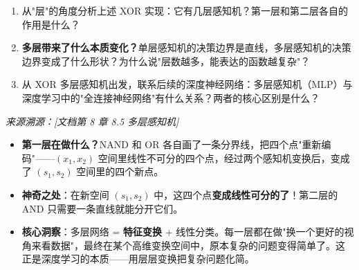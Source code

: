 \documentclass[a4paper,11pt]{ctexart}
\begin{document}
\begin{problembox}
\begin{enumerate}[(1)]
        \item 从"层"的角度分析上述 XOR 实现：它有几层感知机？第一层和第二层各自的作用是什么？

        \item \textbf{多层带来了什么本质变化？}单层感知机的决策边界是直线，多层感知机的决策边界变成了什么形状？为什么说"层数越多，能表达的函数越复杂"？

        \item 从 XOR 多层感知机出发，联系后续的深度神经网络：多层感知机（MLP）与深度学习中的"全连接神经网络"有什么关系？两者的核心区别是什么？
    \end{enumerate}

    \vspace{0.2cm}
    {\color{gray}\small\textit{来源溯源：[文档第 8 章 8.5 多层感知机]}}
\end{problembox}

\begin{beginnerbox}
    \begin{itemize}
        \item \textbf{第一层在做什么？}NAND 和 OR 各自画了一条分界线，把四个点"重新编码"——$(x_1, x_2)$ 空间里线性不可分的四个点，经过两个感知机变换后，变成了 $(s_1, s_2)$ 空间里的四个新点。
        \item \textbf{神奇之处}：在新空间 $(s_1, s_2)$ 中，这四个点\textbf{变成线性可分的了}！第二层的 AND 只需要一条直线就能分开它们。
        \item \textbf{核心洞察}：多层网络 = \textbf{特征变换} + 线性分类。每一层都在做"换一个更好的视角来看数据"，最终在某个高维变换空间中，原本复杂的问题变得简单了。这正是深度学习的本质——用层层变换把复杂问题化简。
    \end{itemize}
\end{beginnerbox}
\end{document}
